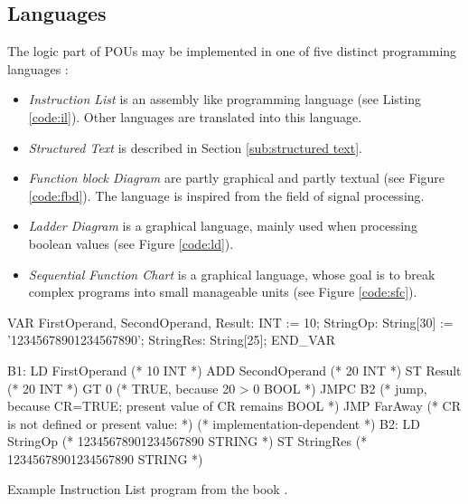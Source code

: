\subsection{Languages}
\label{sub:iec-lang}
The logic part of POUs may be implemented in one of five distinct programming languages \cite{johnIEC611313Programming2010}:
\begin{itemize}
	\item \emph{Instruction List} is an assembly like programming language (see Listing \ref{code:il}). Other languages are translated into this language.
	\item \emph{Structured Text} is described in Section \ref{sub:structured text}.
	\item \emph{Function block Diagram} are partly graphical and partly textual (see Figure \ref{code:fbd}). The language is inspired from the field of signal processing. 
	\item \emph{Ladder Diagram} is a graphical language, mainly used when processing boolean values (see Figure \ref{code:ld}).
	\item \emph{Sequential Function Chart} is a graphical language, whose goal is to break complex programs into small manageable units (see Figure \ref{code:sfc}). 
\end{itemize}

\begin{program}[h!]
	\begin{GenericCode}
VAR
	FirstOperand, SecondOperand, Result: INT := 10;
	StringOp: String[30] := '12345678901234567890';
	StringRes: String[25];
END_VAR
		
B1:	LD FirstOperand (* 10 {INT} *)
ADD SecondOperand (* 20 {INT} *)
ST Result (* 20 {INT} *)
GT 0 (* TRUE, because 20 > 0 {BOOL} *)
JMPC B2
(* jump, because CR=TRUE; present value of CR remains {BOOL} *)
JMP FarAway (* CR is not defined or present value: *)
(* implementation-dependent *)
B2: LD StringOp (* 12345678901234567890 {STRING} *)
ST StringRes (* 12345678901234567890 {STRING} *)\end{GenericCode}
	\caption{Example Instruction List program from the book \cite{johnIEC611313Programming2010}.}
	\label{code:il}
\end{program}


